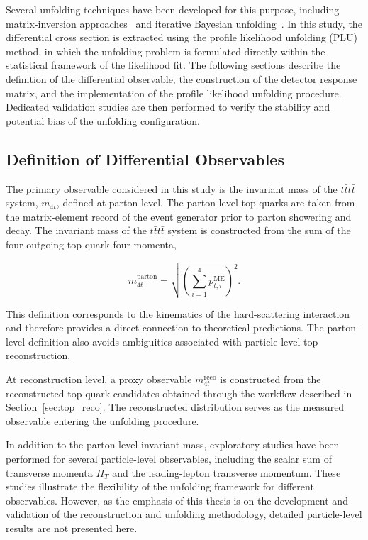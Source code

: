 Several unfolding techniques have been developed for this purpose, including matrix-inversion approaches~\cite{RooUnfoldInvert} and iterative Bayesian unfolding~\cite{DAgostini2010}. 
In this study, the differential cross section is extracted using the profile likelihood unfolding (PLU) method, in which the unfolding problem is formulated directly within the statistical framework of the likelihood fit.
The following sections describe the definition of the differential observable, the construction of the detector response matrix, and the implementation of the profile likelihood unfolding procedure. 
Dedicated validation studies are then performed to verify the stability and potential bias of the unfolding configuration.

\subsection{Definition of Differential Observables}

The primary observable considered in this study is the invariant mass of the $t\bar{t}t\bar{t}$ system, $m_{4t}$, defined at parton level. 
The parton-level top quarks are taken from the matrix-element record of the event generator prior to parton showering and decay. 
The invariant mass of the $t\bar{t}t\bar{t}$ system is constructed from the sum of the four outgoing top-quark four-momenta,

\begin{equation}
m_{4t}^{\text{parton}} =
\sqrt{\left(\sum_{i=1}^{4} p_{t,i}^{\text{ME}}\right)^2}.
\end{equation}

This definition corresponds to the kinematics of the hard-scattering interaction and therefore provides a direct connection to theoretical predictions. 
The parton-level definition also avoids ambiguities associated with particle-level top reconstruction.

At reconstruction level, a proxy observable $m_{4t}^{\text{reco}}$ is constructed from the reconstructed top-quark candidates obtained through the workflow described in Section~\ref{sec:top_reco}. 
The reconstructed distribution serves as the measured observable entering the unfolding procedure.

In addition to the parton-level invariant mass, exploratory studies have been performed for several particle-level observables, including the scalar sum of transverse momenta $H_T$ and the leading-lepton transverse momentum. 
These studies illustrate the flexibility of the unfolding framework for different observables. 
However, as the emphasis of this thesis is on the development and validation of the reconstruction and unfolding methodology, detailed particle-level results are not presented here.

